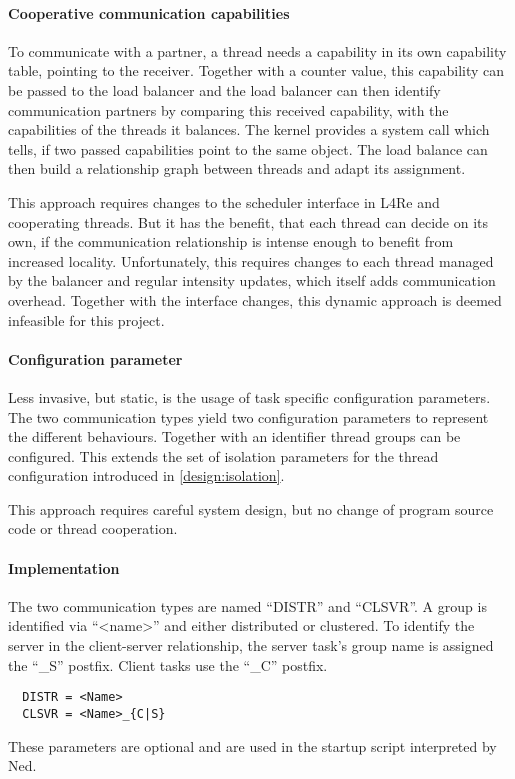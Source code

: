 \paragraph{Cooperative communication capabilities}
To communicate with a partner, a thread needs a capability in its own
capability table, pointing to the receiver.
Together with a counter value, this capability can be passed to the load
balancer and the load balancer can then identify communication partners
by comparing this received capability, with the capabilities of the threads
it balances.
The kernel provides a system call which tells, if two passed capabilities point
to the same object.
The load balance can then build a relationship graph between threads and adapt
its assignment.

This approach requires changes to the scheduler interface in L4Re and
cooperating threads.
But it has the benefit, that each thread can decide on its own, if the
communication relationship is intense enough to benefit from increased
locality.
Unfortunately, this requires changes to each thread managed by the balancer and
regular intensity updates, which itself adds communication overhead.
Together with the interface changes, this dynamic approach is deemed infeasible
for this project.

\paragraph{Configuration parameter}
Less invasive, but static, is the usage of task specific configuration parameters.
The two communication types yield two configuration parameters to represent the
different behaviours.
Together with an identifier thread groups can be configured.
This extends the set of isolation parameters for the thread configuration
introduced in \ref{design:isolation}.

This approach requires careful system design, but no change of program source
code or thread cooperation.

\paragraph{Implementation}
The two communication types are named ``DISTR'' and ``CLSVR''.
A group is identified via ``<name>'' and either distributed or clustered.
To identify the server in the client-server relationship, the server task's
group name is assigned the ``\_S'' postfix.
Client tasks use the ``\_C'' postfix.

\begin{lstlisting}
  DISTR = <Name>
  CLSVR = <Name>_{C|S}
\end{lstlisting}

These parameters are optional and are used in the startup script interpreted by
Ned.
